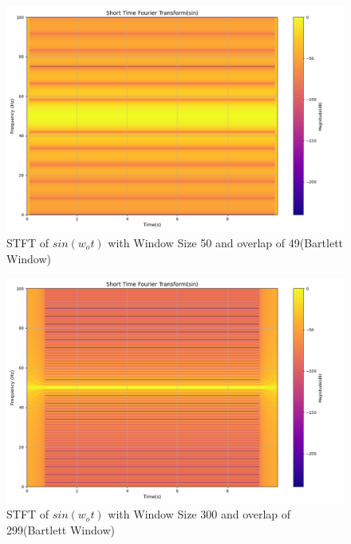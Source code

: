 \documentclass[12pt,a4paper,onecolumn]{exam}
\begin{document}
\begin{solution}
\begin{itemize}
\begin{itemize}
\begin{itemize}
      \end{itemize}

        \begin{figure}[H]
        \centering
        \includegraphics[scale = 0.35]{sin_1_50.0.png}
        \caption{STFT of $sin(w_ot)$ with Window Size 50 and overlap of 49(Bartlett Window)}
        \label{fig:1}
        \end{figure}

        \begin{figure}[H]
        \centering
        \includegraphics[scale = 0.35 ]{sin_1_300.0.png}
        \caption{STFT of $sin(w_ot)$ with Window Size 300 and overlap of 299(Bartlett Window)}
        \label{fig:2}
        \end{figure}


\end{itemize}
\end{itemize}
\end{solution}
\end{document}
